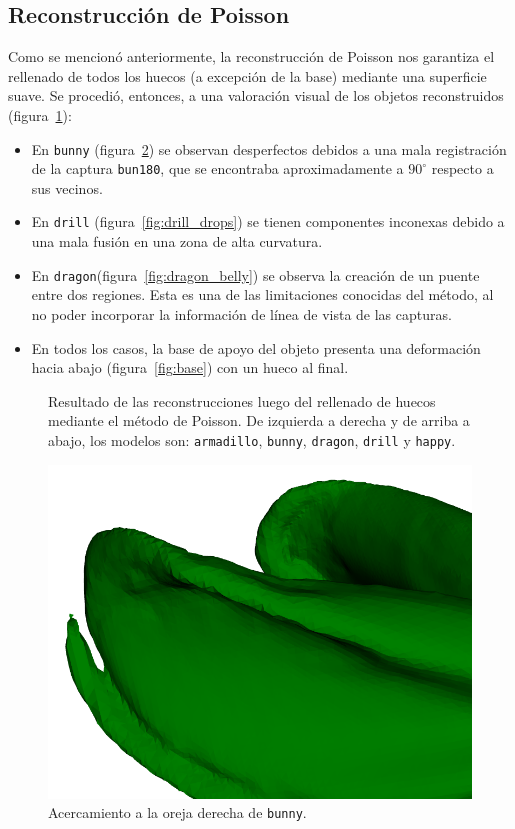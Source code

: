 		\subsection{Reconstrucción de Poisson}
		Como se mencionó anteriormente, la reconstrucción de Poisson nos garantiza el
		rellenado de todos los huecos (a excepción de la base) mediante una superficie suave.
		Se procedió, entonces, a una valoración visual de los objetos reconstruidos (figura~\ref{fig:poiss_all}):
		\begin{itemize}
			\item En \texttt{bunny} (figura~\ref{fig:bun_ear}) se observan desperfectos debidos a una mala registración de la captura \texttt{bun180},
				que se encontraba aproximadamente a $90^{\circ}$ respecto a sus vecinos.
			\item En \texttt{drill} (figura~\ref{fig:drill_drops}) se tienen componentes inconexas debido a una mala fusión en una zona de alta curvatura.
			\item En \texttt{dragon}(figura~\ref{fig:dragon_belly}) se observa la creación de un puente entre dos regiones.
				Esta es una de las limitaciones conocidas del método, al no poder incorporar la información de línea de vista de las capturas\cite{Kazhdan:2006:PSR:1281957.1281965}.
			\item En todos los casos, la base de apoyo del objeto presenta una deformación hacia abajo (figura~\ref{fig:base}) con un hueco al final.
		\end{itemize}

		\begin{figure}
			\caption[Resultado de las reconstrucciones]{\label{fig:poiss_all}Resultado de las reconstrucciones luego del rellenado de huecos mediante el método de Poisson.
			De izquierda a derecha y de arriba a abajo, los modelos son:
			\texttt{armadillo},
			\texttt{bunny},
			\texttt{dragon},
			\texttt{drill}
			y \texttt{happy}.}
		\end{figure}

		\begin{figure}
			\centering
			\includegraphics[max width=.5\linewidth, max height=.25\textheight, keepaspectratio]
				{img/bunny_ear}
			\caption[Acercamiento a la oreja derecha de \texttt{bunny}]{\label{fig:bun_ear}Acercamiento a la oreja derecha de \texttt{bunny}.}
		\end{figure}

